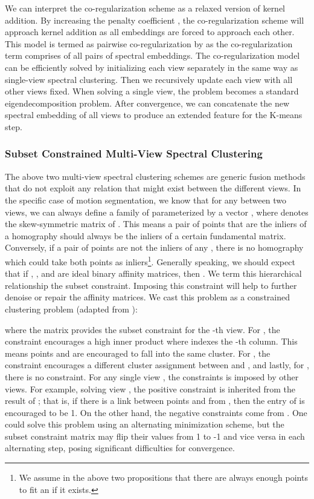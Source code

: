 \documentclass[10pt,twocolumn,letterpaper]{article}
\begin{document}
We can interpret the co-regularization scheme as a relaxed version of kernel addition. By increasing the penalty coefficient , the co-regularization scheme will approach kernel addition as all embeddings are forced to approach each other. This model is termed as pairwise co-regularization by \cite{Kumar2011} as the co-regularization term comprises of all pairs of spectral embeddings. The co-regularization model can be efficiently solved by initializing each view  separately in the same way as single-view spectral clustering. Then we recursively update each view with all other views fixed. When solving a single view, the problem becomes a standard eigendecomposition problem. 
After convergence, we can concatenate the new spectral embedding of all views to produce an extended feature for the K-means step.


\vspace{-0.2cm}
\subsubsection{Subset Constrained Multi-View Spectral Clustering}


The above two multi-view spectral clustering schemes are generic fusion methods that do not exploit any relation that might exist between the different views. In the specific case of motion segmentation, we know that for any  between two views, we can always define a family of  parameterized by a vector , where  denotes the skew-symmetric matrix of  \cite{hartley2003multiple}. This means a pair of points that are the inliers of a homography should always be the inliers of a certain fundamental matrix. Conversely, if a pair of points are not the inliers of any , there is no homography which could take both points as inliers\footnote{We assume in the above two propositions that there are always enough points to fit an  if it exists.}. Generally speaking, we should expect that if , , and  are ideal binary affinity matrices, then . We term this hierarchical relationship the subset constraint. Imposing this constraint will help to further denoise or repair the affinity matrices. We cast this problem as a constrained clustering problem (adapted from \cite{Wang2014}):


\noindent
where the matrix  provides the subset constraint for the -th view. For , the constraint encourages a high inner product  where  indexes the -th column. This means points  and  are encouraged to fall into the same cluster. For , the constraint encourages a different cluster assignment between  and , and lastly, for , there is no constraint. For any single view , the constraints  is imposed by other views. For example, solving view , the positive constraint  is inherited from the result of ; that is, if there is a link between points  and  from , then the  entry of  is encouraged to be 1. On the other hand, the negative constraints come from . One could solve this problem using an alternating minimization scheme, but the subset constraint matrix  may flip their values from 1 to -1 and vice versa in each alternating step, posing significant difficulties for convergence.
\end{document}
